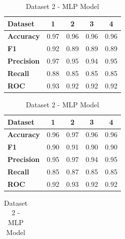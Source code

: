 \begin{table}[H]
    \centering
    \caption{MLP model cross-performance results}\label{tab:mlp_model_cross-performance_results}
        \begin{subtable}[H]{0.45\textwidth}
            \centering
            \begin{tabular}{|l|c|c|c|c|}
                \hline
                \textbf{Dataset} & \textbf{1} & \textbf{2} & \textbf{3} & \textbf{4} \\
                \hline
                \textbf{Accuracy} & 0.97 & 0.96 & 0.96 & 0.96 \\
                \textbf{F1} & 0.92 & 0.89 & 0.89 & 0.89 \\
                \textbf{Precision} & 0.97 & 0.95 & 0.94 & 0.95 \\
                \textbf{Recall} & 0.88 & 0.85 & 0.85 & 0.85 \\
                \textbf{ROC} & 0.93 & 0.92 & 0.92 & 0.92 \\
                \hline
            \end{tabular}
            \caption{Dataset 1 - MLP Model}\label{subtab:dataset_1_mlp_model}
        \end{subtable}
    \quad
    \begin{subtable}[H]{0.45\textwidth}
        \centering
        \begin{tabular}{|l|c|c|c|c|}
            \hline
            \textbf{Dataset} & \textbf{1} & \textbf{2} & \textbf{3} & \textbf{4} \\
            \hline
            \textbf{Accuracy} & 0.96 & 0.97 & 0.96 & 0.96 \\
            \textbf{F1} & 0.90 & 0.91 & 0.90 & 0.90 \\
            \textbf{Precision} & 0.95 & 0.97 & 0.94 & 0.95 \\
            \textbf{Recall} & 0.85 & 0.87 & 0.85 & 0.85 \\
            \textbf{ROC} & 0.92 & 0.93 & 0.92 & 0.92 \\
            \hline
        \end{tabular}
        \caption{Dataset 2 - MLP Model}\label{subtab:dataset_2_mlp_model}
    \end{subtable}
    \quad
    \begin{subtable}[H]{0.45\textwidth}
        \centering
        \begin{tabular}{|l|c|c|c|c|}

\end{tabular}
\end{subtable}
\end{table}
